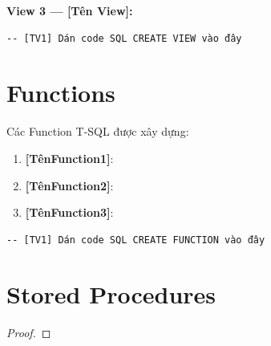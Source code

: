 \noindent\textbf{View 3 — [Tên View]:} %

\begin{lstlisting}[style=sql, caption={View [TênView3]}]
-- [TV1] Dán code SQL CREATE VIEW vào đây
\end{lstlisting}

\section{Functions}\label{Sec2.5}


\noindent Các Function T-SQL được xây dựng:

\begin{enumerate}
  \item \textbf{[TênFunction1]}: %
  \item \textbf{[TênFunction2]}: %
  \item \textbf{[TênFunction3]}: %
\end{enumerate}


\begin{lstlisting}[style=sql, caption={Function [TênFunction]}]
-- [TV1] Dán code SQL CREATE FUNCTION vào đây
\end{lstlisting}

\section{Stored Procedures}\label{Sec2.6}

\begin{thm}\label{thm2.2}

\end{thm}

\noindent\begin{proof}

  \QEDAa
\end{proof}


